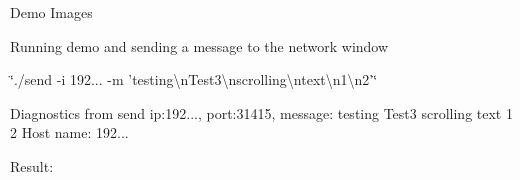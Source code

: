 \begin{DoxyParagraph}{Demo Images}

\begin{DoxyItemize}
\item Running demo and sending a message to the network window
\item \char`\"{}./send -\/i 192... -\/m 'testing\textbackslash{}n\-Test3\textbackslash{}nscrolling\textbackslash{}ntext\textbackslash{}n1\textbackslash{}n2'\char`\"{}
\begin{DoxyItemize}
\item Diagnostics from send ip\-:192..., port\-:31415, message\-: testing Test3 scrolling text 1 2 Host name\-: 192...
\item Result\-:  
\end{DoxyItemize}
\end{DoxyItemize}
\end{DoxyParagraph}
